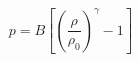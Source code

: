 \documentclass[12pt]{article}
\begin{document}
$$
  p = B [(\frac{\rho}{\rho_0})^{\gamma} - 1]
$$
\end{document}
